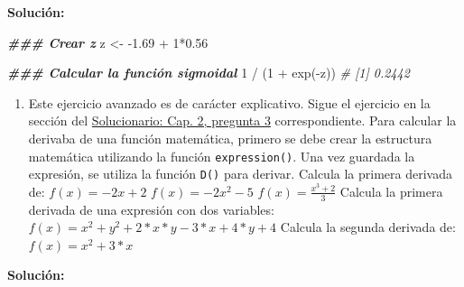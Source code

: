 \documentclass[
]{article}
\newenvironment{Shaded}{\begin{snugshade}}{\end{snugshade}}
\newcommand{\CommentTok}[1]{\textcolor[rgb]{0.56,0.35,0.01}{\textit{#1}}}
\newcommand{\DecValTok}[1]{\textcolor[rgb]{0.00,0.00,0.81}{#1}}
\newcommand{\DocumentationTok}[1]{\textcolor[rgb]{0.56,0.35,0.01}{\textbf{\textit{#1}}}}
\newcommand{\FloatTok}[1]{\textcolor[rgb]{0.00,0.00,0.81}{#1}}
\newcommand{\FunctionTok}[1]{\textcolor[rgb]{0.00,0.00,0.00}{#1}}
\newcommand{\NormalTok}[1]{#1}
\newcommand{\OtherTok}[1]{\textcolor[rgb]{0.56,0.35,0.01}{#1}}
\newcommand{\SpecialCharTok}[1]{\textcolor[rgb]{0.00,0.00,0.00}{#1}}
\providecommand{\tightlist}{%
  \setlength{\itemsep}{0pt}\setlength{\parskip}{0pt}}
\theoremstyle{definition}
\theoremstyle{definition}
\theoremstyle{definition}
\theoremstyle{definition}
\theoremstyle{remark}
\begin{document}
\textbf{Solución:}

\begin{Shaded}
\begin{Highlighting}[]
\DocumentationTok{\#\#\# Crear z}
\NormalTok{z }\OtherTok{\textless{}{-}} \SpecialCharTok{{-}}\FloatTok{1.69} \SpecialCharTok{+} \DecValTok{1}\SpecialCharTok{*}\FloatTok{0.56}

\DocumentationTok{\#\#\# Calcular la función sigmoidal}
\DecValTok{1} \SpecialCharTok{/}\NormalTok{ (}\DecValTok{1} \SpecialCharTok{+} \FunctionTok{exp}\NormalTok{(}\SpecialCharTok{{-}}\NormalTok{z))}
\CommentTok{\# [1] 0.2442}
\end{Highlighting}
\end{Shaded}

\begin{enumerate}
\def\labelenumi{\arabic{enumi}.}
\tightlist
\item
  Este ejercicio avanzado es de carácter explicativo. Sigue el ejercicio en la sección del \protect\hyperlink{cap.-2-primer-contacto-con-r}{Solucionario: Cap. 2, pregunta 3} correspondiente. Para calcular la derivaba de una función matemática, primero se debe crear la estructura matemática utilizando la función \texttt{expression()}. Una vez guardada la expresión, se utiliza la función \texttt{D()} para derivar.
  Calcula la primera derivada de:
  \(f(x)=-2x+2\)
  \(f(x)=-2x^2-5\)
  \(f(x)=\frac{x^3+2}{3}\)
  Calcula la primera derivada de una expresión con dos variables:
  \(f(x)=x^2+y^2+2*x*y-3*x+4*y+4\)
  Calcula la segunda derivada de:
  \(f(x)=x^2+3*x\)
\end{enumerate}

\textbf{Solución:}
\end{document}
